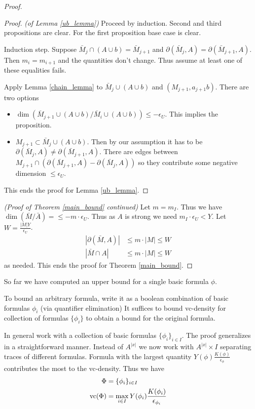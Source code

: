 \documentclass{amsart}
\begin{document}
\begin{proof}
	\begin{proof} \textit{(of Lemma \ref{ub_lemma})}
		Proceed by induction.
		Second and third propositions are clear.
		For the first proposition base case is clear.
		
		Induction step.
		Suppose $\bar M_j \cap (A \cup b) = \bar M_{j+1}$ and $\partial(\bar M_j, A) = \partial(\bar M_{j+1}, A)$.
		Then $m_i = m_{i+1}$ and the quantities don't change.
		Thus assume at least one of these equalities fails.
		
		Apply Lemma \ref{chain_lemma} to $\bar M_j \cup (A \cup b)$ and $(M_{j+1}, a_{j+1}b)$.
		There are two options
		
		\begin{itemize}
			\item $\dim(\bar M_{j+1} \cup (A \cup b) / \bar M_i \cup (A \cup b)) \leq -\epsilon_U$.
			This implies the proposition.
			\item $M_{j+1} \subset \bar M_j \cup (A \cup b)$.
			Then by our assumption it has to be $\partial(\bar M_j, A) \neq \partial(\bar M_{j+1}, A)$.
			There are edges between $M_{j+1} \cap (\partial(\bar M_{j+1}, A) - \partial(\bar M_j, A))$ so they contribute some negative dimension $\leq \epsilon_U$.
		\end{itemize}
		This ends the proof for Lemma \ref{ub_lemma}.
	\end{proof}
	\textit{(Proof of Theorem \ref{main_bound} continued)}
	Let $m = m_I$.
	Thus we have $\dim(\bar M / \bar A) = \leq -m \cdot \epsilon_U $.
	Thus as $A$ is strong we need $m_I \cdot \epsilon_U < Y$.
	Let $W = \frac{|M|Y}{\epsilon_U}$.
	\begin{align*}
		|\partial(\bar M, A)| &\leq m \cdot |M| \leq W \\
		|\bar M \cap A| &\leq m \cdot |M| \leq W
	\end{align*}
	as needed.
	This ends the proof for Theorem \ref{main_bound}.
\end{proof}

So far we have computed an upper bound for a single basic formula $\phi$.

To bound an arbitrary formula, write it as a boolean combination of basic formulas $\phi_i$ (via quantifier elimination)
It suffices to bound vc-density for collection of formulas $\{\phi_i\}$ to obtain a bound for the original formula.

In general work with a collection of basic formulas $\{\phi_i\}_{i \in I}$.
The proof generalizes in a straightforward manner.
Instead of $A^{|x|}$ we now work with $A^{|x|} \times I$ separating traces of different formulas.
Formula with the largest quantity $Y(\phi)\frac{K(\phi)}{\epsilon_\phi}$ contributes the most to the vc-density.
Thus we have
\begin{align*}
	\Phi &= \{\phi_i\}_{i \in I} \\
	\operatorname{vc}(\Phi) &=  \max_{i \in I} Y(\phi_i) \frac{K(\phi_i)}{\epsilon_{\phi_i}}
\end{align*}
\end{document}
